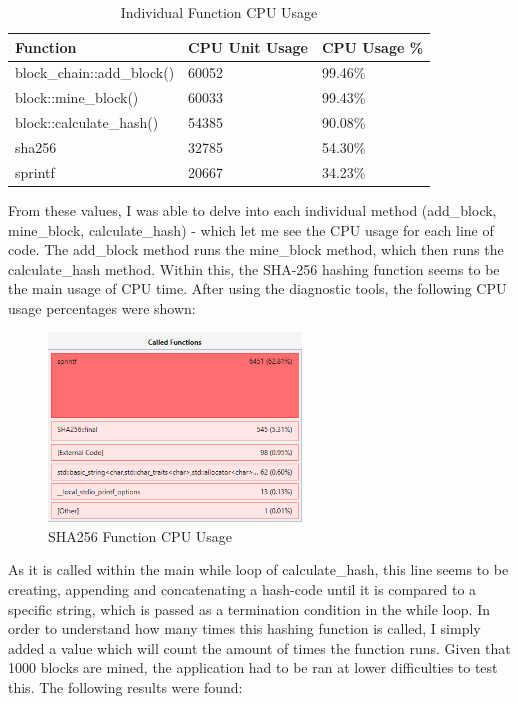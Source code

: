 \documentclass[12pt, a4paper]{article}
\begin{document}
\begin{table}
    \centering
    \begin{tabular}{| l | l | l |}
    \hline
    Function & CPU Unit Usage & CPU Usage \%  \\ \hline
    block\_chain::add\_block() & 60052 & 99.46\% \\ \hline
    block::mine\_block() & 60033 & 99.43\% \\ \hline
    block::calculate\_hash() & 54385 & 90.08\% \\ \hline
    sha256 & 32785 & 54.30\% \\ \hline
    sprintf & 20667 & 34.23\% \\ \hline
    \end{tabular}
    \caption{Individual Function CPU Usage}
\end{table}
\medskip
From these values, I was able to delve into each individual method (add\_block, mine\_block, calculate\_hash) - which let me see the CPU usage for each line of code. The add\_block method runs the mine\_block method, which then runs the calculate\_hash method. Within this, the SHA-256 hashing function seems to be the main usage of CPU time. After using the diagnostic tools, the following CPU usage percentages were shown: \\

\begin{figure}[H]
	\centering
		\includegraphics[width=0.6\textwidth]{"LightSha"}
		\caption{SHA256 Function CPU Usage}
\end{figure}

As it is called within the main while loop of calculate\_hash, this line seems to be creating, appending and concatenating a hash-code until it is compared to a specific string, which is passed as a termination condition in the while loop. In order to understand how many times this hashing function is called, I simply added a value which will count the amount of times the function runs. Given that 1000 blocks are mined, the application had to be ran at lower difficulties to test this. The following results were found: \\
\end{document}
